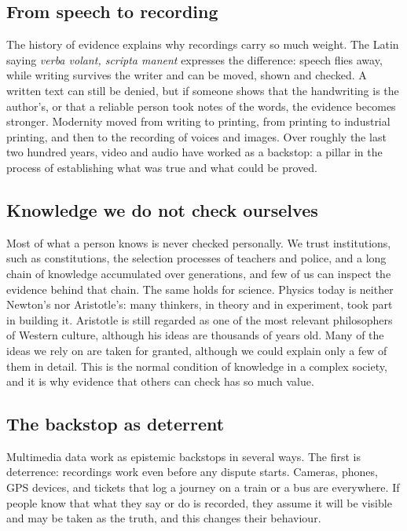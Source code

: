 \subsection{From speech to recording}
The history of evidence explains why recordings carry so much weight. The Latin saying \emph{verba volant, scripta manent} expresses the difference: speech flies away, while writing survives the writer and can be moved, shown and checked. A written text can still be denied, but if someone shows that the handwriting is the author's, or that a reliable person took notes of the words, the evidence becomes stronger. Modernity moved from writing to printing, from printing to industrial printing, and then to the recording of voices and images. Over roughly the last two hundred years, video and audio have worked as a backstop: a pillar in the process of establishing what was true and what could be proved.

\subsection{Knowledge we do not check ourselves}
Most of what a person knows is never checked personally. We trust institutions, such as constitutions, the selection processes of teachers and police, and a long chain of knowledge accumulated over generations, and few of us can inspect the evidence behind that chain. The same holds for science. Physics today is neither Newton's nor Aristotle's: many thinkers, in theory and in experiment, took part in building it. Aristotle is still regarded as one of the most relevant philosophers of Western culture, although his ideas are thousands of years old. Many of the ideas we rely on are taken for granted, although we could explain only a few of them in detail. This is the normal condition of knowledge in a complex society, and it is why evidence that others can check has so much value.

\subsection{The backstop as deterrent}
Multimedia data work as epistemic backstops in several ways. The first is deterrence: recordings work even before any dispute starts. Cameras, phones, GPS devices, and tickets that log a journey on a train or a bus are everywhere. If people know that what they say or do is recorded, they assume it will be visible and may be taken as the truth, and this changes their behaviour.

